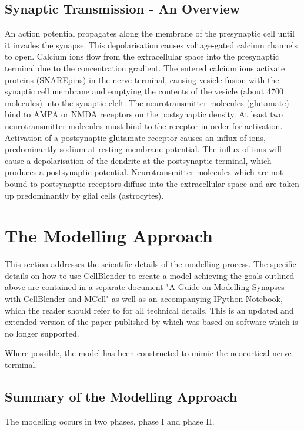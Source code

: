 \documentclass[a4paper]{article}
\begin{document}
\subsection{Synaptic Transmission - An Overview}
An action potential propagates along the membrane of the presynaptic cell until it invades the synapse. This depolarisation causes voltage-gated calcium channels to open. Calcium ions flow from the extracellular space into the presynaptic terminal due to the concentration gradient. The entered calcium ions activate proteins (SNAREpins) in the nerve terminal, causing vesicle fusion with the synaptic cell membrane and emptying the contents of the vesicle (about 4700 molecules) into the synaptic cleft. The neurotransmitter molecules (glutamate) bind to AMPA or NMDA receptors on the postsynaptic density. At least two neurotransmitter molecules must bind to the receptor in order for activation. Activation of a postsynaptic glutamate receptor causes an influx of ions, predominantly sodium at resting membrane potential. The influx of ions will cause a depolarisation of the dendrite at the postsynaptic terminal, which produces a postsynaptic potential. Neurotransmitter molecules which are not bound to postsynaptic receptors diffuse into the extracellular space and are taken up predominantly by glial cells (astrocytes). 

\section{The Modelling Approach}

This section addresses the scientific details of the modelling process. The specific details on how to use CellBlender to create a model achieving the goals outlined above are contained in a separate document "A Guide on Modelling Synapses with CellBlender and MCell" as well as an accompanying IPython Notebook, which the reader should refer to for all technical details. This is an updated and extended version of the paper published by \cite{Czech:MethodsMolBiol:2009} which was based on software which is no longer supported.

Where possible, the model has been constructed to mimic the neocortical nerve terminal.

\subsection{Summary of the Modelling Approach}
The modelling occurs in two phases, phase I and phase II.
\end{document}
